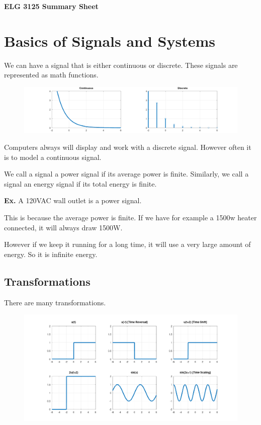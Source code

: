 \documentclass[12pt,letterpaper]{article} \usepackage{amsmath} \usepackage{graphicx} \usepackage[margin=1in]{geometry} \usepackage{longtable}  \usepackage{amssymb}
\begin{document}
	
	\begin{center}
		\Large\textbf{ELG 3125 Summary Sheet} \\
		\vspace{0.5em}
	\end{center}	

	\section{Basics of Signals and Systems}
	We can have a signal that is either continuous or discrete. These signals are represented as math functions.
	\begin{figure}[!h]
		\centering
		\includegraphics[width=0.8\linewidth]{"images/discrete vs cont"}
		\label{fig:discrete-vs-cont}
	\end{figure}
	Computers always will display and work with a discrete signal. However often it is to model a continuous signal. 
	
	We call a signal a power signal if its average power is finite. Similarly, we call a signal an energy signal if its total energy is finite. 
	
	\begin{mdframed}
		\textbf{Ex. } A 120VAC wall outlet is a power signal.
		
		This is because the average power is finite. If we have for example a 1500w heater connected, it will always draw 1500W. 
		
		However if we keep it running for a long time, it will use a very large amount of energy. So it is infinite energy.
	\end{mdframed} 
	
	\subsection{Transformations}
	There are many transformations.
	\begin{figure}
		\centering
		\includegraphics[width=0.8\linewidth]{images/transformations}

		\label{fig:transformations}
	\end{figure}
	
\end{document}
